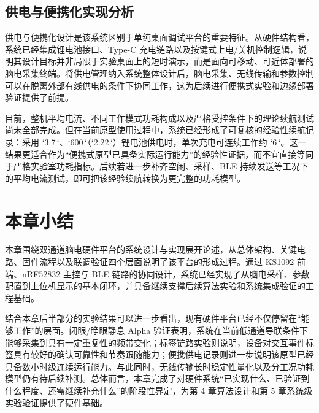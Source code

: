 \subsection{供电与便携化实现分析}

供电与便携化设计是该系统区别于单纯桌面调试平台的重要特征。从硬件结构看，系统已经集成锂电池接口、Type-C 充电链路以及按键式上电/关机控制逻辑，说明其设计目标并非局限于实验桌面上的短时演示，而是面向可移动、可近体部署的脑电采集终端。将供电管理纳入系统整体设计后，脑电采集、无线传输和参数控制可以在脱离外部有线供电的条件下协同工作，这为后续进行便携式实验和边缘部署验证提供了前提。

目前，整机平均电流、不同工作模式功耗构成以及严格受控条件下的理论续航测试尚未全部完成。但在当前原型使用过程中，系统已经形成了可复核的经验性续航记录：采用 `3.7\,`、`600\,`（`2.22\,`）锂电池供电时，单次充电可连续工作约 `6\,`。这一结果更适合作为“便携式原型已具备实际运行能力”的经验性证据，而不宜直接等同于严格实验室功耗指标。后续若进一步补齐空闲、采样、BLE 持续发送等工况下的平均电流测试，即可把该经验续航转换为更完整的功耗模型。

\section{本章小结}

本章围绕双通道脑电硬件平台的系统设计与实现展开论述，从总体架构、关键电路、固件流程以及联调验证四个层面说明了该平台的形成过程。通过 KS1092 前端、nRF52832 主控与 BLE 链路的协同设计，系统已经实现了从脑电采样、参数配置到上位机显示的基本闭环，并具备继续支撑后续算法实验和系统集成验证的工程基础。

结合本章后半部分的实验结果可以进一步看出，现有硬件平台已经不仅停留在“能够工作”的层面。闭眼/睁眼静息 Alpha 验证表明，系统在当前低通道导联条件下能够采集到具有一定重复性的频带变化；标签链路实验则说明，设备对交互事件标签具有较好的确认可靠性和节奏跟随能力；便携供电记录则进一步说明该原型已经具备数小时级连续运行能力。与此同时，无线传输长时稳定性量化以及分工况功耗模型仍有待后续补测。总体而言，本章完成了对硬件系统“已实现什么、已验证到什么程度、还需继续补充什么”的阶段性界定，为第 4 章算法设计和第 5 章系统级实验验证提供了硬件基础。
